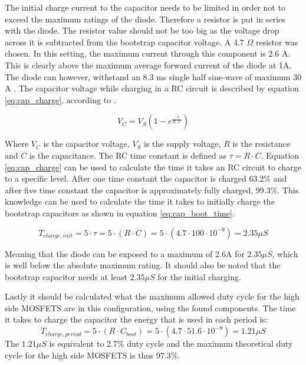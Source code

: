 The initial charge current to the capacitor needs to be limited in order not to exceed the maximum ratings of the diode.
Therefore a resistor is put in series with the diode.
The resistor value should not be too big as the voltage drop across it is subtracted from the bootstrap capacitor voltage.
A 4.7 $\Omega$ resistor was chosen. In this setting, the maximum current through this component is 2.6 A.
This is clearly above the maximum average forward current of the diode at 1A.
The diode can however, withstand an 8.3 ms single half sine-wave of maximum 30 A \cite{diode_ds}.
The capacitor voltage while charging in a RC circuit is described by equation \ref{eq:cap_charge}, according to \cite{prac_ele_for_inven}.

\begin{equation}
	V_C = V_S (1-e^{\frac{-t}{R\cdot C}})
	\label{eq:cap_charge}
\end{equation}

Where $V_C$ is the capacitor voltage, $V_S$ is the supply voltage, $R$ is the resistance and $C$ is the capacitance.
The RC time constant is defined as $\tau = R\cdot C$.
Equation \ref{eq:cap_charge} can be used to calculate the time it takes an RC circuit to charge to a specific level.
After one time constant the capacitor is charged 63.2\% and after five time constant the capacitor is approximately fully charged, 99.3\%.
This knowledge can be used to calculate the time it takes to initially charge the bootstrap capacitors as shown in equation \ref{eq:cap_boot_time}.

\begin{equation}
T_{charge,init} = 5\cdot \tau = 5\cdot (R \cdot C) = 5\cdot (4.7 \cdot 100 \cdot 10^{-9}) = 2.35 \mu S 
\label{eq:cap_boot_time}
\end{equation}

Meaning that the diode can be exposed to a maximum of 2.6A for $2.35 \mu S $, which is well below the absolute maximum rating.
It should also be noted that the bootstrap capacitor needs at least $2.35 \mu S $ for the initial charging.

Lastly it should be calculated what the maximum allowed duty cycle for the high side MOSFETS are in this configuration, using the found components.
The time it takes to charge the capacitor the energy that is used in each period is:
\begin{equation}
	T_{charge,period} = 5\cdot (R \cdot C_{boot}) = 5\cdot (4.7 \cdot  51.6 \cdot 10^{-9}) = 1.21 \mu S 
\end{equation}
The $1.21 \mu S$ is equivalent to 2.7\% duty cycle and the maximum theoretical duty cycle for the high side MOSFETS is thus 97.3\%.

